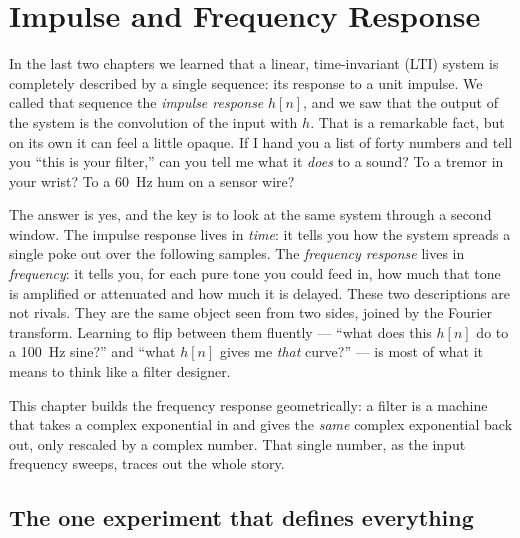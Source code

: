 \chapter{Impulse and Frequency Response}

In the last two chapters we learned that a linear, time-invariant (LTI)
system is completely described by a single sequence: its response to a unit
impulse. We called that sequence the \emph{impulse response} $h[n]$, and we
saw that the output of the system is the convolution of the input with $h$.
That is a remarkable fact, but on its own it can feel a little
opaque. If I hand you a list of forty numbers and tell you ``this is your
filter,'' can you tell me what it \emph{does} to a sound? To a tremor in
your wrist? To a 60~Hz hum on a sensor wire?

The answer is yes, and the key is to look at the same system through a second
window. The impulse response lives in \emph{time}: it tells you how the system
spreads a single poke out over the following samples. The \emph{frequency
response} lives in \emph{frequency}: it tells you, for each pure tone you could
feed in, how much that tone is amplified or attenuated and how much it is
delayed. These two descriptions are not rivals. They are the same object seen
from two sides, joined by the Fourier transform. Learning to flip between them
fluently --- ``what does this $h[n]$ do to a 100~Hz sine?'' and ``what $h[n]$
gives me \emph{that} curve?'' --- is most of what it means to think like a
filter designer.

This chapter builds the frequency response geometrically: a filter is a machine
that takes a complex exponential in and gives the \emph{same} complex
exponential back out, only rescaled by a complex number. That single number,
as the input frequency sweeps, traces out the whole story.

\section{The one experiment that defines everything}
\label{ch14:eigen}

